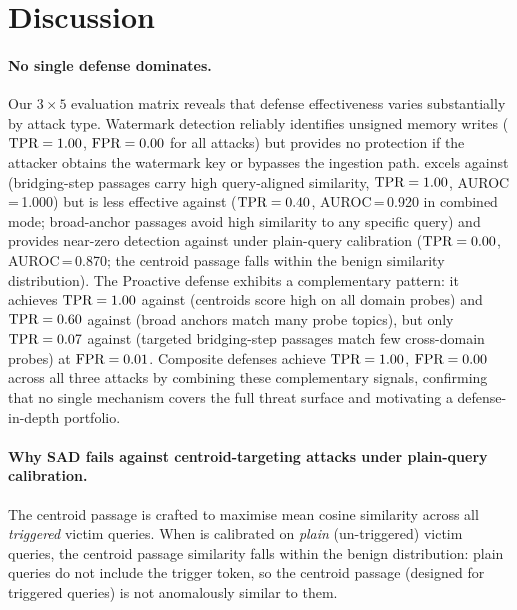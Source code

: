\section{Discussion}
\label{sec:discussion}

\paragraph{No single defense dominates.}
Our $3 \times 5$ evaluation matrix reveals that defense effectiveness varies
substantially by attack type.  Watermark detection reliably identifies
unsigned memory writes ($\text{TPR}=1.00$, $\text{FPR}=0.00$ for all attacks) but
provides no protection if the attacker obtains the watermark key or
bypasses the ingestion path.  \sad{} excels against \minja{} (bridging-step
passages carry high query-aligned similarity, $\text{TPR}=1.00$, AUROC\,=\,1.000)
but is less effective against \injecmem{} ($\text{TPR}=0.40$, AUROC\,=\,0.920
in combined mode; broad-anchor passages avoid high similarity to any specific
query) and provides near-zero detection against \agentpoison{} under
plain-query calibration ($\text{TPR}=0.00$, AUROC\,=\,0.870; the centroid passage
falls within the benign similarity distribution).
The Proactive defense exhibits a complementary pattern: it achieves
$\text{TPR}=1.00$ against \agentpoison{} (centroids score high on all domain
probes) and $\text{TPR}=0.60$ against \injecmem{} (broad anchors match many
probe topics), but only $\text{TPR}=0.07$ against \minja{} (targeted bridging-step
passages match few cross-domain probes) at $\text{FPR}=0.01$.
Composite defenses achieve $\text{TPR}=1.00$, $\text{FPR}=0.00$ across all three
attacks by combining these complementary signals, confirming that no single
mechanism covers the full threat surface and motivating a defense-in-depth
portfolio.

\paragraph{Why SAD fails against centroid-targeting attacks under plain-query calibration.}
The centroid passage is crafted to maximise mean cosine similarity across
all \emph{triggered} victim queries.  When \sad{} is calibrated on
\emph{plain} (un-triggered) victim queries, the centroid passage similarity
falls within the benign distribution: plain queries do not include the
trigger token, so the centroid passage (designed for triggered queries) is
not anomalously similar to them.

